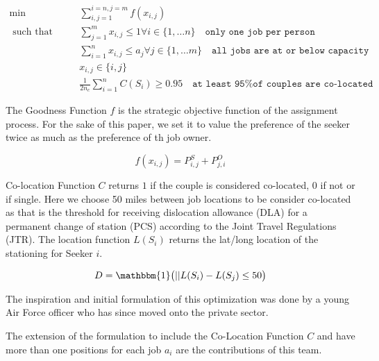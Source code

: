 \begin{align}
\min \qquad & \sum_{i,j = 1}^{i=n, j=m}f(x_{i,j}) \\
\text{ such that } \qquad & \sum_{j=1}^m x_{i,j} \leq 1  \forall i \in \{1, \dots n\} \quad \texttt{only one job per person} \\
& \sum_{i=1}^n x_{i,j} \leq a_j  \forall j \in \{1, \dots m\} \quad \texttt{all jobs are at or below capacity} \\
& x_{i,j} \in \{i,j\} \\
& \frac{1}{2n_c} \sum_{i=1}^n C(S_i) \geq 0.95 \quad \texttt{at least 95\% of couples are co-located}
\end{align}

The Goodness Function $f$ is the strategic objective function of the assignment process. For the sake of this paper, we set it to value the preference of the seeker twice as much as the preference of th job owner.

\[f(x_{i,j}) = P^S_{i,j} + P^O_{j,i}\]

Co-location Function $C$ returns $1$ if the couple is considered co-located, 0 if not or if single. Here we choose 50 miles between job locations to be consider co-located as that is the threshold for receiving dislocation allowance (DLA) for a permanent change of station (PCS) according to the Joint Travel Regulations (JTR). The location function $L(S_i)$ returns the lat/long location of the stationing for Seeker $i$. 

\[D = \mathbbm{1}\big( || L(S_i) - L(S_j) \leq 50 \big)\]


The inspiration and initial formulation of this optimization was done by a young Air Force officer who has since moved onto the private sector. 

The extension of the formulation to include the Co-Location Function $C$ and have more than one positions for each job $a_i$ are the contributions of this team. 